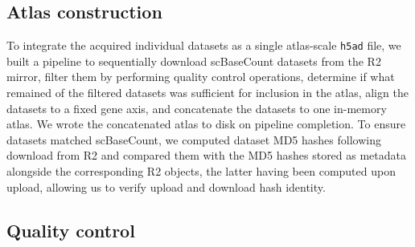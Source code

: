 \documentclass[10pt,letterpaper]{article}
\begin{document}
\subsection*{Atlas construction}
To integrate the acquired individual datasets as a single atlas-scale \texttt{h5ad} file, we built a pipeline to sequentially download scBaseCount datasets from the R2 mirror, filter them by performing quality control operations, determine if what remained of the filtered datasets was sufficient for inclusion in the atlas, align the datasets to a fixed gene axis, and concatenate the datasets to one in-memory atlas. We wrote the concatenated atlas to disk on pipeline completion. To ensure datasets matched scBaseCount, we computed dataset MD5 hashes following download from R2 and compared them with the MD5 hashes stored as metadata alongside the corresponding R2 objects, the latter having been computed upon upload, allowing us to verify upload and download hash identity.

\subsection*{Quality control}
\end{document}
